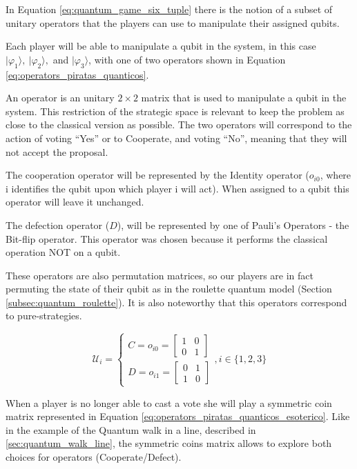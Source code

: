 In Equation \ref{eq:quantum_game_six_tuple} there is the notion of a subset of unitary operators that the players can use to manipulate their assigned qubits. 

Each player will be able to manipulate a qubit in the system, in this case $\vert\varphi_{1}\rangle,\:\vert\varphi_{2}\rangle,$ and $\vert\varphi_{3}\rangle$, with one of two operators shown in Equation \ref{eq:operators_piratas_quanticos}. 

An operator is an unitary $2\times2$ matrix that is used to manipulate a qubit in the system.
This restriction of the strategic space is relevant to keep the problem as close to the classical version as possible. The two operators will correspond to the action of voting ``Yes'' or to Cooperate, and voting ``No'', meaning that they will not accept the proposal.  

The cooperation operator will be represented by the Identity operator ($o_{i0}$, where i identifies the qubit upon which player i will act). When assigned to a qubit this operator will leave it unchanged. 

The defection operator ($D$), will be represented by one of Pauli's Operators - the Bit-flip operator. This operator was chosen because it performs the classical operation NOT on a qubit.

These operators are also permutation matrices, so our players are in fact permuting the state of their qubit as in the roulette quantum model (Section \ref{subsec:quantum_roulette}). It is also noteworthy that this operators correspond to pure-strategies.

\begin{equation}
\label{eq:operators_piratas_quanticos}
\mathcal{U}_{i} = \begin{cases}
C = o_{i0}=\left[\begin{array}{cc}
1 & 0\\
0 & 1
\end{array}\right]\\
D = o_{i1}=\left[\begin{array}{cc}
0 & 1\\
1 & 0
\end{array}\right]
\end{cases} , i \in \{ 1, 2, 3 \}
\end{equation}

When a player is no longer able to cast a vote she will play a symmetric coin matrix represented in Equation \ref{eq:operators_piratas_quanticos_esoterico}. Like in the example of the Quantum walk in a line, described in \ref{sec:quantum_walk_line}, the symmetric coins matrix allows to explore both choices for operators (Cooperate/Defect).

